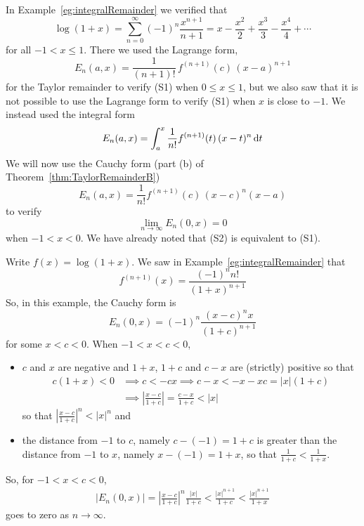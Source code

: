 \begin{eg} \label{eg:cauchyRemainder}
In Example~\ref{eg:integralRemainder} we verified that
\begin{equation*}
\log(1+x) = \sum_{n=0}^\infty (-1)^n\frac{x^{n+1}}{n+1}
     = x-\frac{x^2}{2}+\frac{x^3}{3}-\frac{x^4}{4}+\cdots 
\tag{S1}\end{equation*}
for all $-1<x\le 1$. There we used the Lagrange form,
\begin{equation*}
E_n(a,x)=\frac{1}{(n+1)!}\,f^{(n+1)}(c)\, (x-a)^{n+1}
\end{equation*} 
for the Taylor remainder to verify (S1) when $0\le x\le 1$, but we also saw that it is not possible to use the Lagrange form to verify (S1) when $x$ is close to 
$-1$. We instead used the integral form 
\begin{equation*}
E_n(a,x) = \int_a^x \frac{1}{n!}f^{(n+1)}(t)\, (x-t)^n\,\mathrm{d}t
\end{equation*}
We will now use the Cauchy form (part (b) of Theorem~\ref{thm:TaylorRemainderB})
\begin{equation*}
E_n(a,x)=\frac{1}{n!}f^{(n+1)}(c)\, (x-c)^n(x-a)
\end{equation*}
to verify
\begin{equation*}
\lim_{n\rightarrow\infty} E_n(0,x)=0
\tag{S2}\end{equation*}
when $-1<x<0$.
We have already noted that (S2) is equivalent to (S1).

Write $f(x)=\log(1+x)$. We saw in Example~\ref{eg:integralRemainder} that
\begin{equation*}
f^{(n+1)}(x) = \frac{(-1)^n n!}{(1+x)^{n+1}}
\end{equation*} 
So, in this example, the Cauchy form is
\begin{equation*}
E_n(0,x)=(-1)^n\frac{(x-c)^nx}{(1+c)^{n+1}}
\end{equation*}
for some $x<c<0$. When $-1<x<c<0$, 
\begin{itemize}
\item
$c$ and $x$ are negative and $1+x$, $1+c$ and $c-x$ are (strictly) positive so that
\begin{align*}
c(1+x)<0
&\implies c < -cx
\implies c-x < -x-xc=|x|(1+c)
\\
&\implies \left|\frac{x-c}{1+c}\right|
=\frac{c-x}{1+c}<|x|
\end{align*}
 so that $\left|\frac{x-c}{1+c}\right|^n < |x|^n$ 
  and
\item
  the distance from $-1$ to $c$, namely $c-(-1)=1+c$ is greater than the distance from
  $-1$ to $x$, namely $x-(-1)=1+x$, so that $\frac{1}{1+c}<\frac{1}{1+x}$.
\end{itemize}
So, for $-1<x<c<0$,
\begin{align*}
|E_n(0,x)|=\left|\frac{x-c}{1+c}\right|^n\frac{|x|}{1+c}
          <\frac{|x|^{n+1}}{1+c}
          <\frac{|x|^{n+1}}{1+x}
\end{align*}
goes to zero as $n\rightarrow\infty$.
\end{eg}

